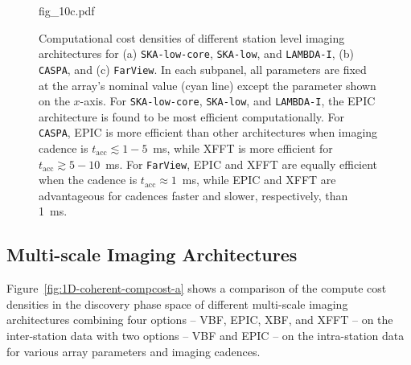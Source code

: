 \documentclass[
  journal=pasa,
  manuscript=article-type,
  year=2020,
  volume=37,
]{cup-journal}
\begin{document}
\begin{figure}
{%
{fig_10c.pdf}
}
\caption{Computational cost densities of different station level imaging architectures for (a) \texttt{SKA-low-core}, \texttt{SKA-low}, and \texttt{LAMBDA-I}, (b) \texttt{CASPA}, and (c) \texttt{FarView}. In each subpanel, all parameters are fixed at the array's nominal value (cyan line) except the parameter shown on the $x$-axis. For \texttt{SKA-low-core}, \texttt{SKA-low}, and \texttt{LAMBDA-I}, the EPIC architecture is found to be most efficient computationally. For \texttt{CASPA}, EPIC is more efficient than other architectures when imaging cadence is $t_\textrm{acc}\lesssim 1-5$~ms, while XFFT is more efficient for $t_\textrm{acc}\gtrsim 5-10$~ms. For \texttt{FarView}, EPIC and XFFT are equally efficient when the cadence is $t_\textrm{acc}\approx 1$~ms, while EPIC and XFFT are advantageous for cadences faster and slower, respectively, than 1~ms.  \label{fig:1D-incoherent-compcost}}
\end{figure}

\subsection{Multi-scale Imaging Architectures}\label{sec:multi-scale-imaging}

Figure~\ref{fig:1D-coherent-compcost-a} shows a comparison of the compute cost densities in the discovery phase space of different multi-scale imaging architectures combining four options -- VBF, EPIC, XBF, and XFFT -- on the inter-station data with two options -- VBF and EPIC -- on the intra-station data for various array parameters and imaging cadences.  
\end{document}
